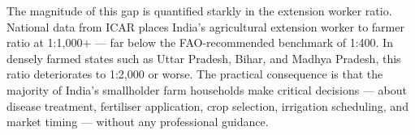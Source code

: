 \documentclass[12pt,a4paper]{article}
\providecommand{\textrupee}{Rs.~}
\begin{document}
The magnitude of this gap is quantified starkly in the extension worker ratio. National data from ICAR \cite{icar2023} places India's agricultural extension worker to farmer ratio at 1:1,000+ --- far below the FAO-recommended benchmark of 1:400. In densely farmed states such as Uttar Pradesh, Bihar, and Madhya Pradesh, this ratio deteriorates to 1:2,000 or worse. The practical consequence is that the majority of India's smallholder farm households make critical decisions --- about disease treatment, fertiliser application, crop selection, irrigation scheduling, and market timing --- without any professional guidance.

\end{document}
